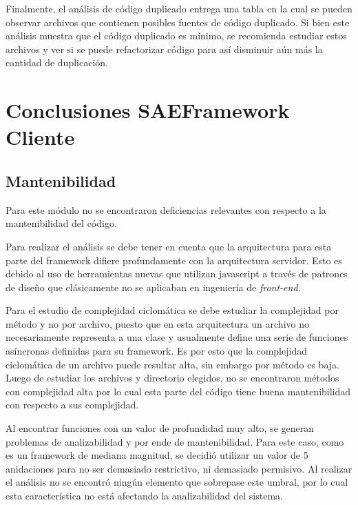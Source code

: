 Finalmente, el análisis de código duplicado entrega una tabla en la cual se 
pueden observar archivos que contienen posibles fuentes de código duplicado. 
Si bien este análisis muestra que el código duplicado es mínimo, se recomienda 
estudiar estos archivos y ver si se puede refactorizar código para así disminuir 
aún más la cantidad de duplicación.

\section{Conclusiones SAEFramework Cliente}

\subsection{Mantenibilidad}

Para este módulo no se encontraron deficiencias relevantes con respecto a la 
mantenibilidad del código.

Para realizar el análisis se debe tener en cuenta que la arquitectura para 
esta parte del framework difiere profundamente con la arquitectura servidor. 
Esto es debido al uso de herramientas nuevas que utilizan javascript a través 
de patrones de diseño que clásicamente no se aplicaban en ingeniería de \textit{front-end}.

Para el estudio de complejidad ciclomática se debe estudiar la complejidad por 
método y no por archivo, puesto que en esta arquitectura un archivo no 
necesariamente representa a una clase y usualmente define una serie de funciones 
asíncronas definidas para su framework. Es por esto que la complejidad 
ciclomática de un archivo puede resultar alta, sin embargo por método es baja. 
Luego de estudiar los archivos y directorio elegidos, no se encontraron métodos 
con complejidad alta por lo cual esta parte del código tiene buena mantenibilidad 
con respecto a sus complejidad.

Al encontrar funciones con un valor de profundidad muy alto, se generan 
problemas de analizabilidad y por ende de mantenibilidad. Para este caso, 
como es un framework de mediana magnitud, se decidió utilizar un valor de 5 
anidaciones para no ser demasiado restrictivo, ni demasiado permisivo. 
Al realizar el análisis no se encontró ningún elemento que sobrepase este 
umbral, por lo cual esta característica no está afectando la analizabilidad del 
sistema.

